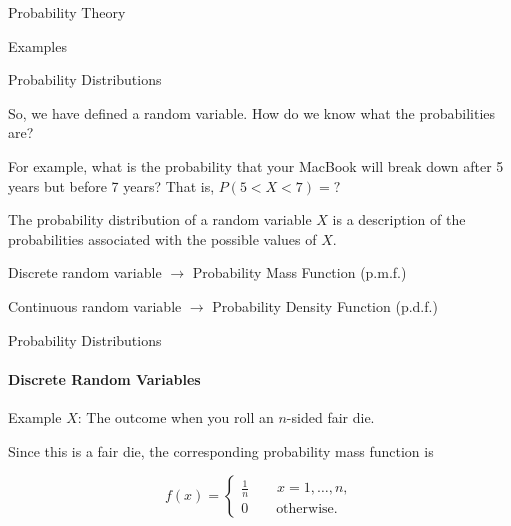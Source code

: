 \documentclass{beamer}\usepackage[]{graphicx}\usepackage[]{color}
\begin{document}
\begin{darkframes}
\begin{frame}[label=lists]{Probability Theory}
\begin{exampleblock}{Examples}
\begin{itemize}
			\end{itemize}
        \end{exampleblock}
  
	\end{frame}  	
	
	
  
  
  
  
  
	\begin{frame}[label=lists]{Probability Distributions}
	
		So, we have defined a random variable. How do we know what the probabilities are? \newline \pause
		
		For example, what is the probability that your MacBook will break down after 5 years but before 7 years? That is, $P(5<X<7)=?$\newline \pause
  
		
      	\begin{definition}
       		The \alert{probability distribution} of a random variable $X$ is a description of the probabilities associated with the possible values of $X$. 
			\newline       \pause 		
       		
       		Discrete random variable $\rightarrow$ Probability Mass Function (p.m.f.) \pause
       		
       		Continuous random variable $\rightarrow$ Probability Density Function (p.d.f.)

      	\end{definition}
    
    
		
  
	\end{frame}  	
	  
  
  




	\begin{frame}[label=lists]{Probability Distributions}
		\framesubtitle{Discrete Random Variables} 
	
		\begin{exampleblock}{Example}
			$X$: The outcome when you roll an $n$-sided fair die. \pause
			
      \smallskip
			Since this is a fair die, the corresponding probability mass function is
			
			$$ f(x) = 
			\begin{cases}
				\frac{1}{n} \qquad x= 1,\ldots,n, \\
				0 \qquad   \text{otherwise.}
			\end{cases}
			$$
        \end{exampleblock} \pause
        

\end{frame}
\end{darkframes}
\end{document}

